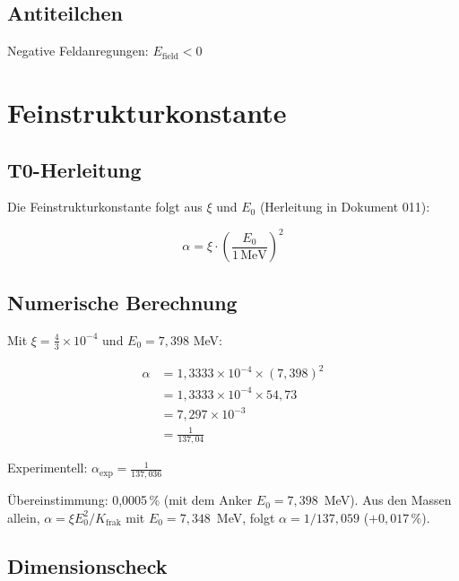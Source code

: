 	\subsection{Antiteilchen}
	
	Negative Feldanregungen: $E_{\text{field}} < 0$
	
	\section{Feinstrukturkonstante}
	\label{sec:fine_structure}
	
	\subsection{T0-Herleitung}
	
	Die Feinstrukturkonstante folgt aus $\xi$ und $E_0$ (Herleitung in Dokument 011):
	
	\begin{equation}
		\boxed{\alpha = \xi \cdot \left(\frac{E_0}{1\,\text{MeV}}\right)^2}
		\label{eq:alpha_derivation}
	\end{equation}
	
	\subsection{Numerische Berechnung}
	
	Mit $\xi = \frac{4}{3} \times 10^{-4}$ und $E_0 = 7{,}398$ MeV:
	
	\begin{align}
		\alpha &= 1{,}3333 \times 10^{-4} \times (7{,}398)^2 \\
		&= 1{,}3333 \times 10^{-4} \times 54{,}73 \\
		&= 7{,}297 \times 10^{-3} \\
		&= \frac{1}{137{,}04}
	\end{align}
	
	Experimentell: $\alpha_{\text{exp}} = \frac{1}{137{,}036}$
	
	Übereinstimmung: 0,0005\,\% (mit dem Anker $E_0 = 7{,}398$~MeV). Aus den Massen allein, $\alpha = \xi E_0^2/K_{\text{frak}}$ mit $E_0 = 7{,}348$~MeV, folgt $\alpha = 1/137{,}059$ ($+0{,}017\,\%$).

	\subsection{Dimensionscheck}
	
